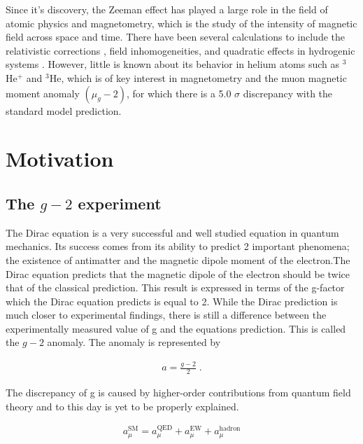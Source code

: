     
        Since it's discovery, the Zeeman effect has played a large role in the field of atomic physics and magnetometry, which is the study of the intensity of magnetic field across space and time. There have been several calculations to include the relativistic corrections \cite{2007Drake-Wu, Drake-Yan}, field inhomogeneities, and quadratic effects in hydrogenic systems \cite{Fontanari_Sadovskií_2015}. However, little is known about its behavior in helium atoms such as $^3$He$^+$ and $^3$He, which is of key interest in magnetometry and the muon magnetic moment anomaly $(\mu_g - 2)$, for which there is a 5.0 $\sigma$ discrepancy \cite{aguillard2023measurement} with the standard model prediction.

    \section{Motivation}\label{sec:motivation}
        \subsection{The $g-2$ experiment}\label{sec:g-2}
        The Dirac equation is a very successful and well studied equation in quantum mechanics. Its success comes from its ability to predict 2 important phenomena; the existence of antimatter and the magnetic dipole moment of the electron.The Dirac equation predicts that the magnetic dipole of the electron should be twice that of the classical prediction. This result is expressed in terms of the g-factor which the Dirac equation predicts is equal to 2. While the Dirac prediction is much closer to experimental findings, there is still a difference between the experimentally measured value of g and the equations prediction. This is called the $g-2$ anomaly. The anomaly is represented by


        \begin{align}
            a = \frac{g - 2}{2}\;.
        \end{align}

        \noindent The discrepancy of g is caused by higher-order contributions from quantum field theory and to this day is yet to be properly explained. 

        \begin{align}
            a^{\text{SM}}_\mu = a_\mu^{\text{QED}} + a_\mu^{\text{EW}} + a_\mu^{\text{hadron}}
        \end{align}

